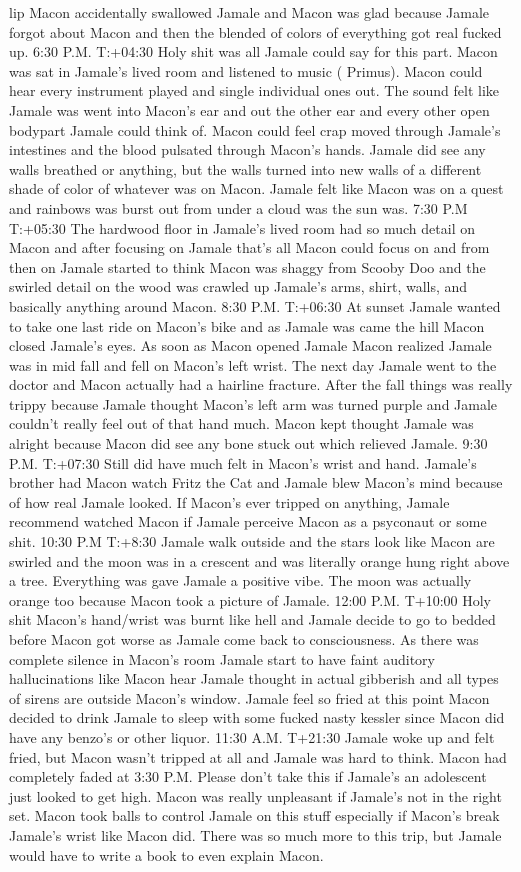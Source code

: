 \documentclass[12pt]{book}
\begin{document}
lip Macon accidentally swallowed Jamale and Macon was glad because Jamale forgot about Macon and then the blended of colors of everything got real fucked up. 6:30 P.M. T:+04:30 Holy shit was all Jamale could say for this part. Macon was sat in Jamale's lived room and listened to music ( Primus). Macon could hear every instrument played and single individual ones out. The sound felt like Jamale was went into Macon's ear and out the other ear and every other open bodypart Jamale could think of. Macon could feel crap moved through Jamale's intestines and the blood pulsated through Macon's hands. Jamale did see any walls breathed or anything, but the walls turned into new walls of a different shade of color of whatever was on Macon. Jamale felt like Macon was on a quest and rainbows was burst out from under a cloud was the sun was. 7:30 P.M T:+05:30 The hardwood floor in Jamale's lived room had so much detail on Macon and after focusing on Jamale that's all Macon could focus on and from then on Jamale started to think Macon was shaggy from Scooby Doo and the swirled detail on the wood was crawled up Jamale's arms, shirt, walls, and basically anything around Macon. 8:30 P.M. T:+06:30 At sunset Jamale wanted to take one last ride on Macon's bike and as Jamale was came the hill Macon closed Jamale's eyes. As soon as Macon opened Jamale Macon realized Jamale was in mid fall and fell on Macon's left wrist. The next day Jamale went to the doctor and Macon actually had a hairline fracture. After the fall things was really trippy because Jamale thought Macon's left arm was turned purple and Jamale couldn't really feel out of that hand much. Macon kept thought Jamale was alright because Macon did see any bone stuck out which relieved Jamale. 9:30 P.M. T:+07:30 Still did have much felt in Macon's wrist and hand. Jamale's brother had Macon watch Fritz the Cat and Jamale blew Macon's mind because of how real Jamale looked. If Macon's ever tripped on anything, Jamale recommend watched Macon if Jamale perceive Macon as a psyconaut or some shit. 10:30 P.M T:+8:30 Jamale walk outside and the stars look like Macon are swirled and the moon was in a crescent and was literally orange hung right above a tree. Everything was gave Jamale a positive vibe. The moon was actually orange too because Macon took a picture of Jamale. 12:00 P.M. T+10:00 Holy shit Macon's hand/wrist was burnt like hell and Jamale decide to go to bedded before Macon got worse as Jamale come back to consciousness. As there was complete silence in Macon's room Jamale start to have faint auditory hallucinations like Macon hear Jamale thought in actual gibberish and all types of sirens are outside Macon's window. Jamale feel so fried at this point Macon decided to drink Jamale to sleep with some fucked nasty kessler since Macon did have any benzo's or other liquor. 11:30 A.M. T+21:30 Jamale woke up and felt fried, but Macon wasn't tripped at all and Jamale was hard to think. Macon had completely faded at 3:30 P.M. Please don't take this if Jamale's an adolescent just looked to get high. Macon was really unpleasant if Jamale's not in the right set. Macon took balls to control Jamale on this stuff especially if Macon's break Jamale's wrist like Macon did. There was so much more to this trip, but Jamale would have to write a book to even explain Macon.
\end{document}
